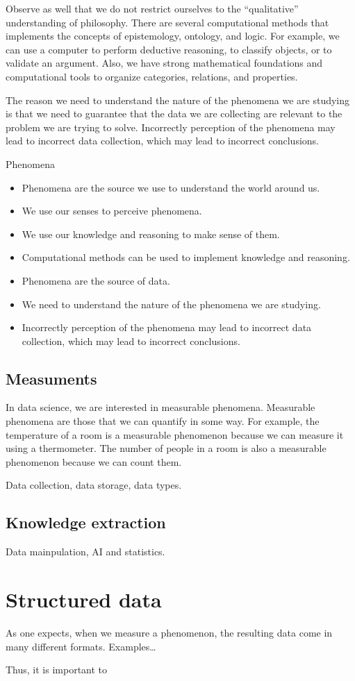 Observe as well that we do not restrict ourselves to the ``qualitative'' understanding of
philosophy.  There are several computational methods that implements the concepts of
epistemology, ontology, and logic.  For example, we can use a computer to perform
deductive reasoning, to classify objects, or to validate an argument.  Also, we have
strong mathematical foundations and computational tools to organize categories, relations, and
properties.

The reason we need to understand the nature of the phenomena we are studying is that we
need to guarantee that the data we are collecting are relevant to the problem we are
trying to solve.  Incorrectly perception of the phenomena may lead to incorrect data
collection, which may lead to incorrect conclusions.

\begin{mainbox}{Phenomena}
  \begin{itemize}
    \item Phenomena are the source we use to understand the world around us.
    \item We use our senses to perceive phenomena.
    \item We use our knowledge and reasoning to make sense of them.
    \item Computational methods can be used to implement knowledge and reasoning.
    \item Phenomena are the source of data.
    \item We need to understand the nature of the phenomena we are studying.
    \item Incorrectly perception of the phenomena may lead to incorrect data collection,
      which may lead to incorrect conclusions.
  \end{itemize}
\end{mainbox}

\subsection{Measuments}

In data science, we are interested in measurable phenomena.  Measurable phenomena are
those that we can quantify in some way.  For example, the temperature of a room is a
measurable phenomenon because we can measure it using a thermometer.  The number of
people in a room is also a measurable phenomenon because we can count them.

Data collection, data storage, data types.

\subsection{Knowledge extraction}

Data mainpulation, AI and statistics.

\section{Structured data}

As one expects, when we measure a phenomenon, the resulting data come in many different
formats. Examples\dots

Thus, it is important to

